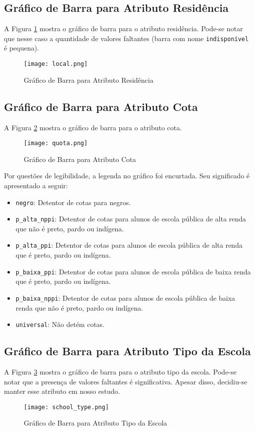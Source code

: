 \subsection{Gráfico de Barra para Atributo Residência}
A Figura \ref{atr_res} mostra o gráfico de barra para o atributo residência. Pode-se
notar que nesse caso a quantidade de valores faltantes (barra com nome
\texttt{indisponível} é pequena). 
\begin{figure}[!ht]
    \caption{Gráfico de Barra para Atributo Residência}
    \centering
    \texttt{[image: local.png]}
    \label{atr_res}
\end{figure}
\clearpage

\subsection{Gráfico de Barra para Atributo Cota}
A Figura \ref{atr_quota} mostra o gráfico de barra para o atributo cota. 
\begin{figure}[!ht]
    \caption{Gráfico de Barra para Atributo Cota}
    \centering
    \texttt{[image: quota.png]}
    \label{atr_quota}
\end{figure}

Por questões de legibilidade, a legenda no gráfico foi encurtada. Seu significado é
apresentado a seguir: 
\begin{itemize}
    \item \texttt{negro}: Detentor de cotas para negros.
    \item \texttt{p\_alta\_nppi}: Detentor de cotas para alunos de escola pública de
        alta renda que não é preto, pardo ou indígena.
    \item \texttt{p\_alta\_ppi}: Detentor de cotas para alunos de escola pública de
        alta renda que é preto, pardo ou indígena.
    \item \texttt{p\_baixa\_ppi}: Detentor de cotas para alunos de escola pública de
        baixa renda que é preto, pardo ou indígena.
    \item \texttt{p\_baixa\_nppi}: Detentor de cotas para alunos de escola pública de
        baixa renda que não é preto, pardo ou indígena.
    \item \texttt{universal}: Não detém cotas.
\end{itemize}

\subsection{Gráfico de Barra para Atributo Tipo da Escola}
A Figura \ref{atr_school} mostra o gráfico de barra para o atributo tipo da escola.
Pode-se notar que a presença de valores faltantes é significativa. Apesar disso,
decidiu-se manter esse atributo em nosso estudo. 
\begin{figure}[!ht]
    \caption{Gráfico de Barra para Atributo Tipo da Escola}
    \centering
    \texttt{[image: school\_type.png]}
    \label{atr_school}
\end{figure}

